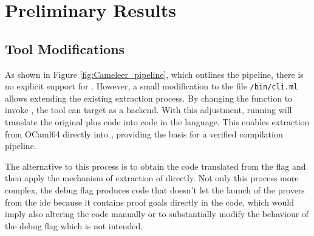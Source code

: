 
%

\chapter{Preliminary Results}
\label{cha:Preliminary_Results}


\section{Tool Modifications}

As shown in Figure \ref{fig:Cameleer_pipeline}, which outlines the \cameleer pipeline, there is no explicit support for \cml. 
However, a small modification to the file \texttt{/bin/cli.ml} allows extending the existing extraction process. By changing the 
 function to invoke , 
the tool can target \cml as a backend. With this adjustment, running  will translate 
the original \ocaml plus \gospel code into code in the \cml language. This enables extraction from \textsf{OCaml64} directly 
into \cml, providing the basis for a verified compilation pipeline.

The alternative to this process is to obtain the code translated \whyml from the flag  and then apply the 
mechanism of extraction of \whythree directly. Not only this process more complex, the debug flag produces code that doesn't 
let the launch of the provers from the \whythree ide because it contains proof goals directly in the code, which would imply 
also altering the code manually or to substantially modify the behaviour of the debug flag which is not intended.



